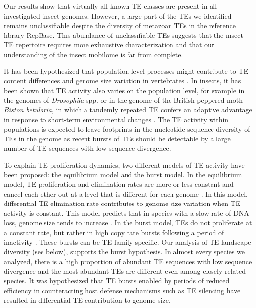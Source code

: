 Our results show that virtually all known TE classes are present in all
investigated insect genomes.  However, a large part of the TEs we
identified remains unclassifiable despite the diversity of metazoan TEs
in the reference library RepBase.  This abundance of unclassifiable TEs
suggests that the insect TE repertoire requires more exhaustive
characterization and that our understanding of the insect mobilome is
far from complete.

It has been hypothesized that population-level processes might
contribute to TE content differences and genome size variation in
vertebrates \citep{Lynch2003a}.  In insects, it has been shown that TE
activity also varies on the population level, for example in the genomes
of \emph{Drosophila} spp.  \citep{Perrat2013,Li2013,Blumenstiel2014} or
in the genome of the British peppered moth \emph{Biston betularia}, in
which a tandemly repeated TE confers an adaptive advantage in response
to short-term environmental changes \citep{Hof2016}. The TE activity
within populations is expected to leave footprints in the nucleotide
sequence diversity of TEs in the genome as recent bursts of TEs should
be detectable by a large number of TE sequences with low sequence
divergence.

To explain TE proliferation dynamics, two different models of TE
activity have been proposed: the equilibrium model and the burst model.
In the equilibrium model, TE proliferation and elimination rates are
more or less constant and cancel each other out at a level that is
different for each genome \citep{Charlesworth1983}. In this model,
differential TE elimination rate contributes to genome size variation
when TE activity is constant. This model predicts that in species with a
slow rate of DNA loss, genome size tends to increase
\citep{Petrov2011,Sun2011}.  In the burst model, TEs do not proliferate
at a constant rate, but rather in high copy rate bursts following a
period of inactivity \citep{Blumenstiel2014}. These bursts can be TE
family specific. Our analysis of TE landscape diversity (see below),
supports the burst hypothesis. In almost every species we analyzed,
there is a high proportion of abundant TE sequences with low sequence
divergence and the most abundant TEs are different even among closely
related species. It was hypothesized that TE bursts enabled by periods
of reduced efficiency in counteracting host defense mechanisms such as
TE silencing \citep{LeRouzic2006,Rebollo2010} have resulted in
differential TE contribution to genome size.

